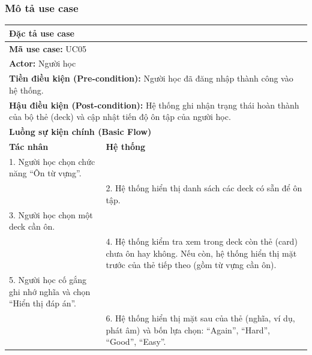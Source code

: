 \documentclass[a4paper,12pt]{extreport}
\begin{document}
\subsubsection{Mô tả use case}
\begin{table}[!ht]
    \centering
    \renewcommand{\arraystretch}{1.1} %
    \begin{tabularx}{\linewidth}{|X|X|}
        \hline
        \multicolumn{2}{|l|}{\textbf{Đặc tả use case}} \\ \hline
        \multicolumn{2}{|l|}{\textbf{Mã use case:} UC05} \\ \hline
        \multicolumn{2}{|l|}{\textbf{Actor:} Người học} \\ \hline
        \multicolumn{2}{|p{\dimexpr\linewidth-2\tabcolsep-2\arrayrulewidth}|}{\textbf{Tiền điều kiện (Pre-condition):} Người học đã đăng nhập thành công vào hệ thống.} \\ \hline
        \multicolumn{2}{|p{\dimexpr\linewidth-2\tabcolsep-2\arrayrulewidth}|}{\textbf{Hậu điều kiện (Post-condition):} Hệ thống ghi nhận trạng thái hoàn thành của bộ thẻ (deck) và cập nhật tiến độ ôn tập của người học.} \\ \hline
        \multicolumn{2}{|l|}{\textbf{Luồng sự kiện chính (Basic Flow)}} \\ \hline
        \textbf{Tác nhân} & \textbf{Hệ thống} \\ \hline
        
        1. Người học chọn chức năng “Ôn từ vựng”. & \\ \hline
        
        & 2. Hệ thống hiển thị danh sách các deck có sẵn để ôn tập. \\ \hline
        
        3. Người học chọn một deck cần ôn. & \\ \hline
        
        & 4. Hệ thống kiểm tra xem trong deck còn thẻ (card) chưa ôn hay không. Nếu còn, hệ thống hiển thị mặt trước của thẻ tiếp theo (gồm từ vựng cần ôn). \\ \hline
        
        5. Người học cố gắng ghi nhớ nghĩa và chọn “Hiển thị đáp án”. & \\ \hline
        
        & 6. Hệ thống hiển thị mặt sau của thẻ (nghĩa, ví dụ, phát âm) và bốn lựa chọn: “Again”, “Hard”, “Good”, “Easy”. \\ \hline
        

\end{tabularx}
\end{table}
\end{document}
